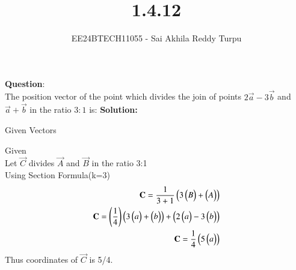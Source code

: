 \documentclass[journal]{IEEEtran}
\begin{document}

\title{1.4.12}
\author{EE24BTECH11055 - Sai Akhila Reddy Turpu}
{\let\newpage\relax\maketitle}
\renewcommand{\thefigure}{\theenumi}
\renewcommand{\thetable}{\theenumi}
\setlength{\intextsep}{10pt} %
\renewcommand{\thetable}{\theenumi}
\textbf{Question}:\\
The position vector of the point which divides the join of points $2\vec{a}-3\vec{b}$ and $\vec{a} + \vec{b}$ in the ratio $3:1$ is:
\textbf{Solution:}
\begin{table}[h]
    \centering
    
    \caption{Given Vectors}
    \label{tab:1}
\end{table}
Given\\
Let $\vec{C}$ divides $\vec{A}$ and $\vec{B}$ in the ratio 3:1\\
Using Section Formula(k=3)
\begin{align}
\vec{C} = \frac{1}{3+1} \brak{3\myvec{B} + \myvec{A}} \\
\vec{C} = \brak{\frac{1}{4}} \brak{3\myvec{a} + \myvec{b}} + \brak{2\myvec{a} - 3\myvec{b}} \\
\vec{C} = \frac{1}{4} \brak{5\myvec{a}}

\end{align}
Thus coordinates of $\vec{C}$ is 5/4. 
\end{document}
